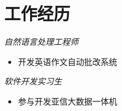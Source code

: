 \section{工作经历}
\textit{自然语言处理工程师}
\begin{itemize}
  \item 开发英语作文自动批改系统
\end{itemize}

\textit{软件开发实习生}
\begin{itemize}
  \item 参与开发亚信大数据一体机
\end{itemize}

